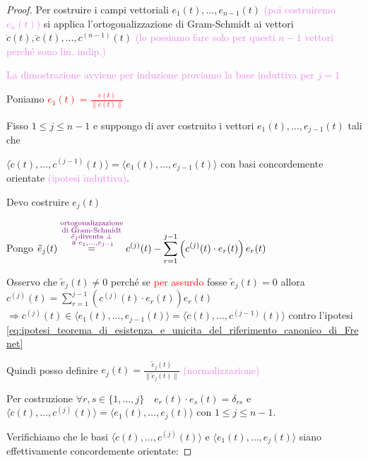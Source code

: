         \begin{proof}
        Per costruire i campi vettoriali $e_1(t), \dots, e_{n-1}(t)$ \textcolor{violet}{(poi costruiremo $e_n(t)$)} si applica l'ortogonalizzazione di Gram-Schmidt ai vettori  $\dot{c}(t), \ddot{c}(t), \dots, c^{(n-1)}(t)$
        \textcolor{violet}{(lo possiamo fare solo per questi $n-1$ vettori perché sono lin. indip.)}
        
        \textcolor{violet}{La dimostrazione avviene per induzione proviamo la base induttiva per $j=1$}

        Poniamo \textcolor{red}{$\displaystyle e_1(t) = \frac{\dot{c}(t)}{\|\dot{c}(t)\|}$}

        Fisso $1 \leq j \leq n-1$ e suppongo di aver costruito i vettori $e_1(t), \dots, e_{j-1}(t)$ tali che 
        
        $\langle \dot{c}(t), \dots, c^{(j-1)}(t) \rangle = \langle e_1(t), \dots, e_{j-1}(t) \rangle$ con basi concordemente orientate \textcolor{violet}{(ipotesi induttiva)}.
        
        Devo costruire $e_j(t)$

        Pongo $\displaystyle \tilde{e}_j(t) \overset{\textcolor{violet}{\substack{\text{ortogonalizzazione} \\ \text{di Gram-Schmidt} \\  \tilde{e}_j \text{diventa } \perp \\ \text{ a } e_1, \dots, e_{j-1}}}}{=}
         c^{(j)}(t) - \sum_{r=1}^{j-1} \left( c^{(j)}(t) \cdot e_r(t) \right) e_r(t)$
        
        Osservo che $\tilde{e}_j(t) \neq 0$ perché se \textcolor{red}{per assurdo} fosse $\tilde{e}_j(t) = 0$ allora $\displaystyle c^{(j)}(t)= \sum_{r=1}^{j-1} \left( c^{(j)}(t) \cdot e_r(t) \right) e_r(t)$
        $\Rightarrow c^{(j)}(t) \in \langle e_1(t), \dots, e_{j-1}(t) \rangle=\langle \dot{c}(t), \dots, c^{(j-1)}(t) \rangle$ contro l'ipotesi \eqref{eq:ipotesi_teorema_di_esistenza_e_unicita_del_riferimento_canonico_di_Frenet}
        
        Quindi posso definire $\displaystyle e_j(t) = \frac{\tilde{e}_j(t)}{\|\tilde{e}_j(t)\|}$ \textcolor{violet}{(normalizzazione)}

        Per costruzione $\forall r,s \in \{1, \dots, j\} \quad  e_r(t) \cdot e_s(t) = \delta_{rs}$ e 
        $\langle \dot{c}(t), \dots, c^{(j)}(t) \rangle = \langle e_1(t), \dots, e_j(t) \rangle$ con $1 \leq j \leq n-1$.

        Verifichiamo che le basi $\langle \dot{c}(t), \dots, c^{(j)}(t) \rangle$ e $\langle e_1(t), \dots, e_j(t) \rangle$ siano effettivamente concordemente orientate:
        

\end{proof}
